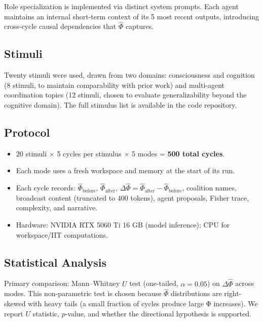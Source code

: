 \documentclass[11pt]{article}
\theoremstyle{definition}
\begin{document}
Role specialization is implemented via distinct system prompts. Each agent maintains an
internal short-term context of its 5 most recent outputs, introducing cross-cycle causal
dependencies that $\hat{\Phi}$ captures.

\subsection{Stimuli}

Twenty stimuli were used, drawn from two domains: consciousness and cognition (8 stimuli,
to maintain comparability with prior work) and multi-agent coordination topics (12 stimuli,
chosen to evaluate generalizability beyond the cognitive domain). The full stimulus list
is available in the code repository.

\subsection{Protocol}

\begin{itemize}[noitemsep]
\item 20 stimuli $\times$ 5 cycles per stimulus $\times$ 5 modes = \textbf{500 total cycles}.
\item Each mode uses a fresh workspace and memory at the start of its run.
\item Each cycle records: $\hat{\Phi}_{\text{before}}$, $\hat{\Phi}_{\text{after}}$,
  $\Delta\hat{\Phi} = \hat{\Phi}_{\text{after}} - \hat{\Phi}_{\text{before}}$, coalition
  names, broadcast content (truncated to 400 tokens), agent proposals, Fisher trace,
  complexity, and narrative.
\item Hardware: NVIDIA RTX 5060 Ti 16 GB (model inference); CPU for workspace/IIT computations.
\end{itemize}

\subsection{Statistical Analysis}

Primary comparison: Mann--Whitney $U$ test (one-tailed, $\alpha = 0.05$) on $\Delta\hat{\Phi}$
across modes. This non-parametric test is chosen because $\hat{\Phi}$ distributions are
right-skewed with heavy tails (a small fraction of cycles produce large Φ increases). We
report $U$ statistic, $p$-value, and whether the directional hypothesis is supported.
\end{document}
